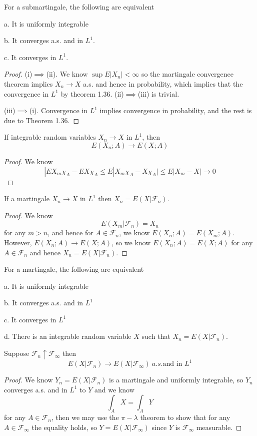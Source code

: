 \documentclass[lang=en, color=blue, ]{elegantbook}
\newcommand{\F}{\mathcal{F}}
\begin{document}
\begin{theorem}
    For a submartingale, the following are equivalent\par
    a. It is uniformly integrable\par
    b. It converges a.s. and in $L^1$.\par
    c. It converges in $L^1$.
\end{theorem}
\begin{proof}
    (i)$\implies$(ii). We know $\sup E|X_n| < \infty$ so the martingale convergence theorem implies $X_n \to X$ a.s. and hence in probability, which implies that the convergence in $L^1$ by theorem 1.36. (ii)$\implies$(iii) is trivial.\par
    (iii)$\implies$(i). Convergence in $L^1$ implies convergence in probability, and the rest is due to Theorem 1.36.
\end{proof}

\begin{lemma}
    If integrable random variables $X_n\to X$ in $L^1$, then
    \[E(X_n;A) \to E(X;A)\]
\end{lemma}
\begin{proof}
    We know
    \[|EX_m\chi_A - EX\chi_A \leq E|X_m\chi_A - X\chi_A| \leq E|X_m - X| \to 0\]
\end{proof}

\begin{lemma}
    If a martingale $X_n\to X$ in $L^1$ then $X_n = E(X|\F_n)$.
\end{lemma}
\begin{proof}
    We know
    \[E(X_m|\F_n) = X_n\]
    for any $m>n$, and hence for $A\in\F_n$, we know $E(X_n;A) = E(X_m;A)$. However, $E(X_n;A) \to E(X;A)$, so we know $E(X_n;A) = E(X;A)$ for any $A\in\F_n$ and hence $X_n = E(X|\F_n)$.
\end{proof}

\begin{theorem}
    For a martingale, the following are equivalent\par
    a. It is uniformly integrable\par
    b. It converges a.s. and in $L^1$\par
    c. It converges in $L^1$\par
    d. There is an integrable random variable $X$ such that $X_n = E(X|\F_n)$.
\end{theorem}

\begin{theorem}
    Suppose $\F_n \uparrow \F_{\infty}$ then
    \[E(X|\F_n) \to E(X|\F_{\infty})\ a.s.\text{and in }L^1\]
\end{theorem}
\begin{proof}
    We know $Y_n = E(X|\F_n)$ is a martingale and uniformly integrable, so $Y_n$ converges a.s. and in $L^1$ to $Y$ and we know
    \[
    \int_A X = \int_A Y
    \]
    for any $A\in\F_n$, then we may use the $\pi-\lambda$ theorem to show that for any $A\in\F_{\infty}$ the equality holds, so $Y = E(X|\F_{\infty})$ since $Y$ is $\F_{\infty}$ measurable.
\end{proof}
\end{document}

